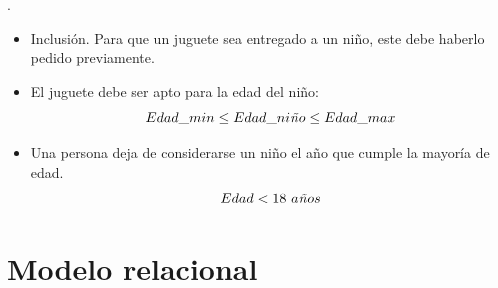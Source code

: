 \documentclass[a4paper, 11pt]{article}
\begin{document}
\begin{noinc}.\\
	\begin{itemize}
		\item Inclusión. Para que un juguete sea entregado a un niño, este debe haberlo pedido previamente. 
		\item El juguete debe ser apto para la edad del niño:
			$$
				Edad\_min \leq Edad\_ni\text{\emph{ñ}}o \leq Edad\_max
			$$
		\item Una persona deja de considerarse un niño el año que cumple la mayoría de edad.
		$$
			Edad < 18\ a\text{\emph{ñ}}os
		$$
	\end{itemize}
\end{noinc}

\newpage

\part*{Modelo relacional}
\end{document}
